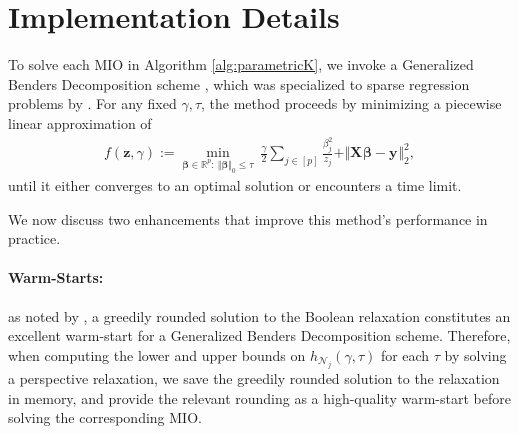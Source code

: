 \documentclass[ijoc,noblindrev]{informs3} %
\begin{document}






\section{Implementation Details}\label{sec:append.implementationdetails}
To solve each MIO in Algorithm \ref{alg:parametricK}, we invoke a Generalized Benders Decomposition scheme \citep{geoffrion1972generalized}, which was specialized to sparse regression problems by \cite{bertsimas2020sparse}. For any fixed $\gamma, \tau$, the method proceeds by minimizing a piecewise linear approximation of 
\begin{align}
    f(\bm{z}, \gamma):=\min_{\bm{\beta} \in \mathbb{R}^p: \ \Vert \bm{\beta}\Vert_0 \leq \tau} \ \frac{\gamma}{2}\sum_{j \in [p]}\frac{\beta_j^2}{z_j}+\Vert \bm{X}^{}\bm{\beta}-\bm{y}^{}\Vert_2^2,\label{prob:persp1}
\end{align}
until it either converges to an optimal solution or encounters a time limit. %

We now discuss two enhancements that improve this method's performance in practice.

\paragraph{Warm-Starts:} as noted by \cite{ bertsimas2021unified}, a greedily rounded solution to the Boolean relaxation constitutes an excellent warm-start for a Generalized Benders Decomposition scheme. Therefore, when computing the lower and upper bounds on $h_{\mathcal{N}_j}(\gamma, \tau)$ for each $\tau$ by solving a perspective relaxation, we save the greedily rounded solution to the relaxation in memory, and provide the relevant rounding as a high-quality warm-start before solving the corresponding MIO. 
\end{document}
